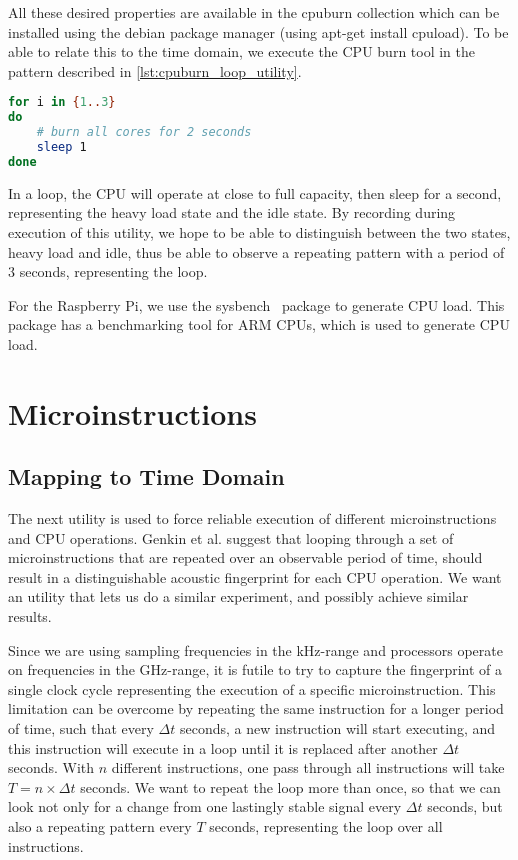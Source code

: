 All these desired properties are available in the cpuburn collection which can be installed using the debian package manager (using
apt-get install cpuload).
To be able to relate this to the time domain, we execute the \gls{CPU} burn tool in the pattern described in \autoref{lst:cpuburn_loop_utility}.

\begin{lstlisting}[language=BASH, caption={Mapping execution to the time domain: CPU Burn Utility}, label={lst:cpuburn_loop_utility}]
for i in {1..3}
do
	# burn all cores for 2 seconds
	sleep 1
done
\end{lstlisting}

In a loop, the \gls{CPU} will operate at close to full capacity, then sleep for a second, representing the heavy load state and the idle state.
By recording during execution of this utility, we hope to be able to distinguish between the two states, heavy load and idle, thus be able to observe a repeating pattern with a period of \(3\) seconds, representing the loop.

For the Raspberry Pi, we use the sysbench~\cite{url:sysbench_wiki} package to generate CPU load. 
This package has a benchmarking tool for ARM \gls{CPU}s, which is used to generate \gls{CPU} load.

\section{Microinstructions}\label{chp4:sec:microinstructions}


\subsection{Mapping to Time Domain}\label{chp4:sec:mapping_to_time_domain}
The next utility is used to force reliable execution of different microinstructions and \gls{CPU} operations.
Genkin et al. suggest that looping through a set of microinstructions that are repeated over an observable period of time, should result in a distinguishable acoustic fingerprint for each \gls{CPU} operation.
We want an utility that lets us do a similar experiment, and possibly achieve similar results.

Since we are using sampling frequencies in the kHz-range and processors operate on frequencies in the GHz-range, it is futile to try to capture the fingerprint of a single clock cycle representing the execution of a specific microinstruction. 
This limitation can be overcome by repeating the same instruction for a longer period of time, such that every \(\Delta t\) seconds, a new instruction will start executing, and this instruction will execute in a loop until it is replaced after another \(\Delta t\) seconds.
With \(n\) different instructions, one pass through all instructions will take \(T = n \times \Delta t\) seconds.
We want to repeat the loop more than once, so that we can look not only for a change from one lastingly stable signal every \(\Delta t\) seconds, but also a repeating pattern every \(T\) seconds, representing the loop over all instructions.

